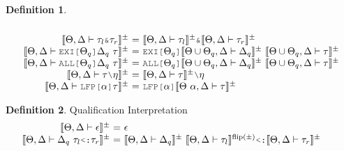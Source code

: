 \documentclass[acmsmall]{acmart}
\theoremstyle{definition}
\newtheorem{definition}{Definition}[section]
\begin{document}
\begin{definition}
\[\begin{array}[t]{r@{}c@{}lcl}
      \\

      \llbracket \Theta, \Delta \entails \tau_l\J{\&}\tau_r \rrbracket^\pm 
      &\ =\ & 
      \llbracket \Theta, \Delta \entails \tau_l \rrbracket^\pm
      \J{\&}
      \llbracket \Theta, \Delta \entails \tau_r \rrbracket^{\pm}

      \\

      \llbracket \Theta, \Delta \entails \J{EXI[}\Theta_q\J{]} \Delta_q\ \tau \rrbracket^\pm 
      &\ =\ & 
      \J{EXI[}\Theta_q\J{]} \llbracket \Theta \cup \Theta_q, \Delta \entails \Delta_q \rrbracket^\pm 
      \ \llbracket \Theta \cup \Theta_q, \Delta \entails \tau \rrbracket^{\pm}

      \\

      \llbracket \Theta, \Delta \entails \J{ALL[}\Theta_q\J{]} \Delta_q\ \tau \rrbracket^\pm 
      &\ =\ & 
      \J{ALL[} \Theta_q \J{]} \llbracket \Theta \cup \Theta_q, \Delta \entails \Delta_q \rrbracket^\pm
      \ \llbracket \Theta \cup \Theta_q, \Delta \entails \tau \rrbracket^{\pm}

      \\

      \llbracket \Theta, \Delta \entails \tau \typdiff \eta \rrbracket^\pm 
      &\ =\ & 
      \llbracket \Theta, \Delta \entails \tau \rrbracket^\pm \typdiff \eta

      \\

      \llbracket \Theta, \Delta \entails \J{LFP[}\alpha \J{]} \tau \rrbracket^\pm 
      &\ =\ & 
      \J{LFP[}\alpha \J{]}\llbracket \Theta\ \alpha, \Delta \entails \tau \rrbracket^{\pm}
      \\
  \end{array}
  \]
\end{definition}

\begin{definition} 
  \label{def:qualification_interpretation}
  Qualification Interpretation 
  \hfill
  \\
  \[
  \begin{array}[t]{r@{}c@{}lcl}
      \llbracket \Theta, \Delta \entails \epsilon \rrbracket^\pm
      &\ =\ & 
      \epsilon
      && 

      \\

      \llbracket \Theta, \Delta \entails \Delta_q \  \tau_l \J{<:} \tau_r \rrbracket^\pm
      &\ =\ & 
      \llbracket \Theta, \Delta \entails \Delta_q\rrbracket^\pm\  
      \llbracket \Theta, \Delta \entails \tau_l \rrbracket^{\text{flip}(\pm)} 
      \J{<:} 
      \llbracket \Theta, \Delta \entails \tau_r \rrbracket^\pm
  \end{array}
  \]
\end{definition} 
\end{document}

